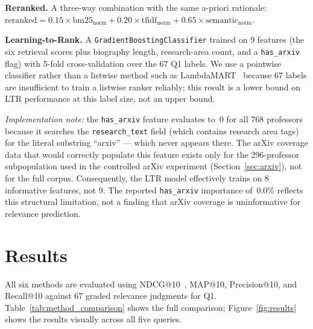 \documentclass[11pt,a4paper]{article}
\begin{document}
\textbf{Reranked.} A three-way combination with the same a-priori rationale:
$\text{reranked} = 0.15 \times \text{bm25}_{\text{norm}} + 0.20 \times \text{tfidf}_{\text{norm}} + 0.65 \times \text{semantic}_{\text{norm}}$.

\textbf{Learning-to-Rank.} A \texttt{GradientBoostingClassifier} trained on
9 features (the six retrieval scores plus biography length, research-area
count, and a \texttt{has\_arxiv} flag) with 5-fold cross-validation over the
67 Q1 labels. We use a pointwise classifier rather than a listwise method
such as LambdaMART~\cite{burges2010ranknet} because 67 labels are
insufficient to train a listwise ranker reliably; this result is a lower
bound on LTR performance at this label size, not an upper bound.

\textit{Implementation note:} the \texttt{has\_arxiv} feature evaluates
to~0 for all 768 professors because it searches the \texttt{research\_text}
field (which contains research area tags) for the literal substring
``arxiv'' --- which never appears there. The arXiv coverage data that would
correctly populate this feature exists only for the 296-professor
subpopulation used in the controlled arXiv experiment
(Section~\ref{sec:arxiv}), not for the full corpus. Consequently, the LTR
model effectively trains on 8 informative features, not 9. The reported \texttt{has\_arxiv} importance of~0.0\% reflects
this structural limitation, not a finding that arXiv coverage is
uninformative for relevance prediction.

\section{Results}
\label{sec:results}

All six methods are evaluated using NDCG@10~\cite{jarvelin2002}, MAP@10,
Precision@10, and Recall@10 against 67 graded relevance judgments
for Q1.
Table~\ref{tab:method_comparison} shows the full comparison;
Figure~\ref{fig:results} shows the results visually across all five queries.
\end{document}

